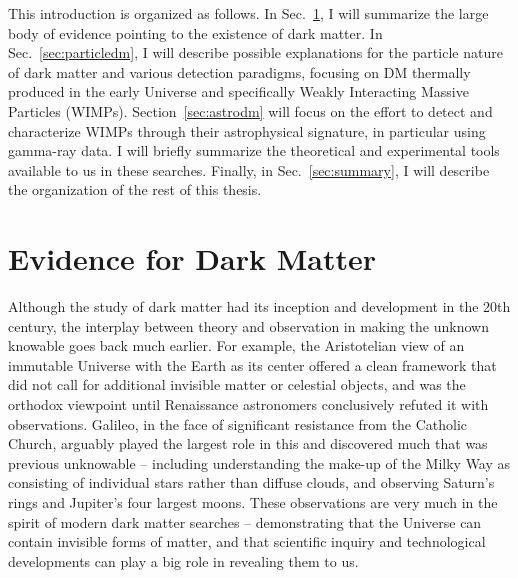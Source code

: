 This introduction is organized as follows. In Sec.~\ref{sec:evidence}, I will summarize the large body of evidence pointing to the existence of dark matter. In Sec.~\ref{sec:particledm}, I will describe possible explanations for the particle nature of dark matter and various detection paradigms, focusing on DM thermally produced in the early Universe and specifically Weakly Interacting Massive Particles (WIMPs). Section~\ref{sec:astrodm} will focus on the effort to detect and characterize WIMPs through their astrophysical signature, in particular using gamma-ray data. I will briefly summarize the theoretical and experimental tools available to us in these searches. Finally, in Sec.~\ref{sec:summary}, I will describe the organization of the rest of this thesis. %

\section{Evidence for Dark Matter}
\label{sec:evidence}

Although the study of dark matter had its inception and development in the 20th century, the interplay between theory and observation in making the unknown knowable goes back much earlier. For example, the Aristotelian view of an immutable Universe with the Earth as its center offered a clean framework that did not call for additional invisible matter or celestial objects, and was the orthodox viewpoint until Renaissance astronomers conclusively refuted it with observations. Galileo, in the face of significant resistance from the Catholic Church, arguably played the largest role in this and discovered much that was previous unknowable -- including understanding the make-up of the Milky Way as consisting of individual stars rather than diffuse clouds, and observing Saturn's rings and Jupiter's four largest moons. These observations are very much in the spirit of modern dark matter searches -- demonstrating that the Universe can contain invisible forms of matter, and that scientific inquiry and technological developments can play a big role in revealing them to us.


